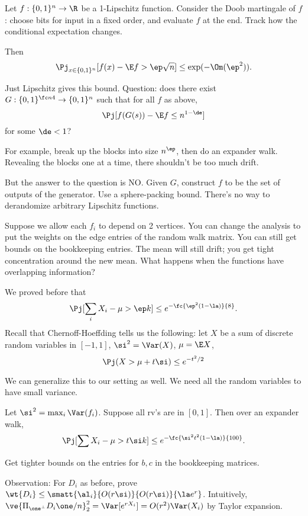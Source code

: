 \begin{lem}
Let $f:\{0,1\}^n\to \R$ be a 1-Lipschitz function.
Consider the Doob martingale of $f$: choose bits for input in a fixed order, and evaluate $f$ at the end. Track how the conditional expectation changes.

Then 
\[
\Pj_{x\in \{0,1\}^n}[f(x)-\E f>\ep \sqrt n]
\le \exp(-\Om(\ep^2)).
\]
\end{lem}
Just Lipschitz gives this bound. Question: does there exist $G:\{0,1\}^{\fc n4}\to \{0,1\}^n$ such that for all $f$ as above,
\[
\Pj[f(G(s))-\E f\le n^{1-\de}]
\]
for some $\de<1$?

For example, break up the blocks into size $n^{\ep}$, then do an expander walk. Revealing the blocks one at a time, there shouldn't be too much drift.

But the answer to the question is NO. Given $G$, construct $f$ to be the set of outputs of the generator. Use a sphere-packing bound.
There's no way to derandomize arbitrary Lipschitz functions.

Suppose we allow each $f_i$ to depend on 2 vertices. You can change the analysis to put the weights on the edge entries of the random walk matrix. You can still get bounds on the bookkeeping entries. The mean will still drift; you get tight concentration around the new mean. What happens when the functions have overlapping information?

We proved before that
\[
\Pj[\sum_i X_i-\mu>\ep k]\le e^{-\fc{\ep^2(1-\la)}{8}}.
\]%
Recall that Chernoff-Hoeffding tells us the following: let $X$ be a sum of discrete random variables in $[-1,1]$, $\si^2=\Var(X)$, $\mu=\E X$,
\[
\Pj(X>\mu+t\si)\le e^{-t^2/2}
\]

We can generalize this to our setting as well. We need all the random variables to have small variance.
\begin{lem}
Let $\si^2=\max_i\Var(f_i)$. Suppose all rv's are in $[0,1]$. %
Then over an expander walk,
\[
\Pj[\sum X_i-\mu>t\si k]\le e^{-\fc{\si^2t^2(1-\la)}{100}}.
\]
\end{lem}
Get tighter bounds on the entries for $b,c$ in the bookkeeping matrices.

Observation: For $D_i$ as before, prove $\wt{D_i} \le \smatt{\al_i}{O(r\si)}{O(r\si)}{\la e^r}$. Intuitively, $\ve{\Pi_{\one^{\perp}}D_i\one/n}_2^2=\Var[e^{rX_i}]=O(r^2) \Var(X_i)$ by Taylor expansion.

